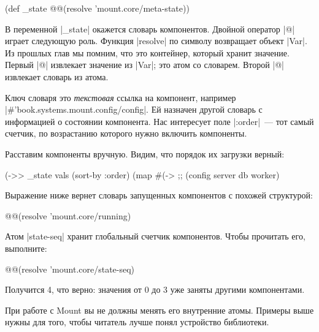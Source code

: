 \begin{english}
  \begin{clojure}
(def _state @@(resolve 'mount.core/meta-state))
  \end{clojure}
\end{english}

В переменной \spverb|_state| окажется словарь компонентов. Двойной оператор
\spverb|@| играет следующую роль. Функция \spverb|resolve| по символу возвращает
объект \spverb|Var|. Из прошлых глав мы помним, что это контейнер, который
хранит значение. Первый \spverb|@| извлекает значение из \spverb|Var|; это атом
со словарем. Второй \spverb|@| извлекает словарь из атома.

Ключ словаря это \emph{текстовая} ссылка на компонент, например
\spverb|#'book.systems.mount.config/config|. Ей назначен другой словарь с
информацией о состоянии компонента. Нас интересует поле \spverb|:order|~--- тот
самый счетчик, по возрастанию которого нужно включить компоненты.

Расставим компоненты вручную. Видим, что порядок их загрузки верный:

\begin{english}
  \begin{clojure}
(->> _state
     vals
     (sort-by :order)
     (map #(-> %
;; (config server db worker)
  \end{clojure}
\end{english}

Выражение ниже вернет словарь запущенных компонентов с похожей структурой:

\begin{english}
  \begin{clojure}
@@(resolve 'mount.core/running)
  \end{clojure}
\end{english}

Атом \spverb|state-seq| хранит глобальный счетчик компонентов. Чтобы прочитать
его, выполните:

\begin{english}
  \begin{clojure}
@@(resolve 'mount.core/state-seq)
  \end{clojure}
\end{english}

Получится 4, что верно: значения от 0 до 3 уже заняты другими компонентами.

При работе с Mount вы не должны менять его внутренние атомы. Примеры
выше нужны для того, чтобы читатель лучше понял устройство библиотеки.

